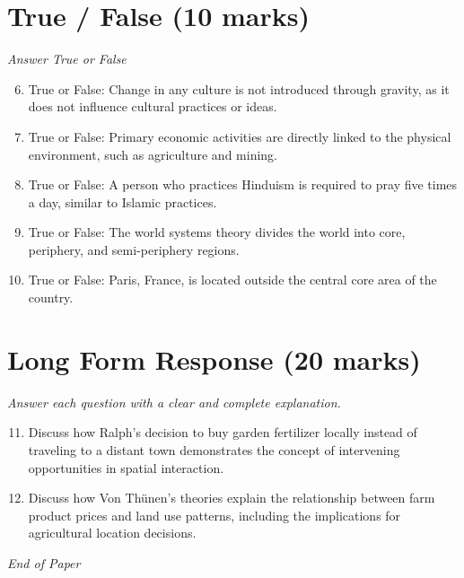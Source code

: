 \documentclass[12pt]{article}
\begin{document}
\section*{True / False (10 marks)}
\textit{Answer True or False}
\begin{enumerate}[label=\arabic*.]
\setcounter{enumi}{5}
\item True or False: Change in any culture is not introduced through gravity, as it does not influence cultural practices or ideas.
\item True or False: Primary economic activities are directly linked to the physical environment, such as agriculture and mining.
\item True or False: A person who practices Hinduism is required to pray five times a day, similar to Islamic practices.
\item True or False: The world systems theory divides the world into core, periphery, and semi-periphery regions.
\item True or False: Paris, France, is located outside the central core area of the country.
\end{enumerate}

\section*{Long Form Response (20 marks)}
\textit{Answer each question with a clear and complete explanation.}
\begin{enumerate}[label=\arabic*.]
\setcounter{enumi}{10}
\item Discuss how Ralph's decision to buy garden fertilizer locally instead of traveling to a
distant town demonstrates the concept of intervening opportunities in spatial interaction.
\item Discuss how Von Thünen's theories explain the relationship between farm product prices and
land use patterns, including the implications for agricultural location decisions.
\end{enumerate}

\vfill
\noindent\textit{End of Paper}
\end{document}
